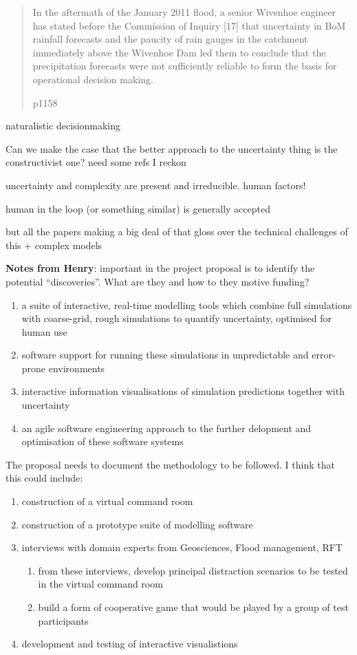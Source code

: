 \documentclass[a4paper,fontsize=12pt]{scrartcl}
\begin{document}
\blockquote[\parencite{vandenhonert_2011_2011} p1158]{In the aftermath of
  the January 2011 flood, a senior Wivenhoe engineer has stated before
  the Commission of Inquiry [17] that uncertainty in BoM rainfall
  forecasts and the paucity of rain gauges in the catchment
  immediately above the Wivenhoe Dam led them to conclude that the
  precipitation forecasts were not sufficiently reliable to form the
  basis for operational decision making.}

naturalistic decisionmaking\parencite{lipshitz_taking_2001}

Can we make the case that the better approach to the uncertainty thing
is the constructivist one? need some refs I reckon


uncertainty and complexity are present and irreducible. human factors!

human in the loop (or something similar) is generally accepted

but all the papers making a big deal of that gloss over the technical
challenges of this + complex models

\textbf{Notes from Henry}: important in the project proposal is to identify the
potential ``discoveries''. What are they and how to they motive
funding?

\begin{enumerate}
\item a suite of interactive, real-time modelling tools which combine
full simulations with coarse-grid, rough simulations to quantify
uncertainty, optimised for human use
\item software support for running these simulations in unpredictable
and error-prone environments
\item interactive information visualisations of simulation predictions
together with uncertainty
\item an agile software engineering approach to the further delopment
and optimisation of these software systems
\end{enumerate}

The proposal needs to document the methodology to be followed. I think
that this could include:

\begin{enumerate}
\item construction of a virtual command room
\item construction of a prototype suite of modelling software
\item interviews with domain experts from Geosciences, Flood
  management, RFT
  \begin{enumerate}
  \item from these interviews, develop principal distraction scenarios
    to be tested in the virtual command room
  \item build a form of cooperative game that would be played by a
    group of test participants
  \end{enumerate}
\item development and testing of interactive visualistions
\end{enumerate}
\end{document}
